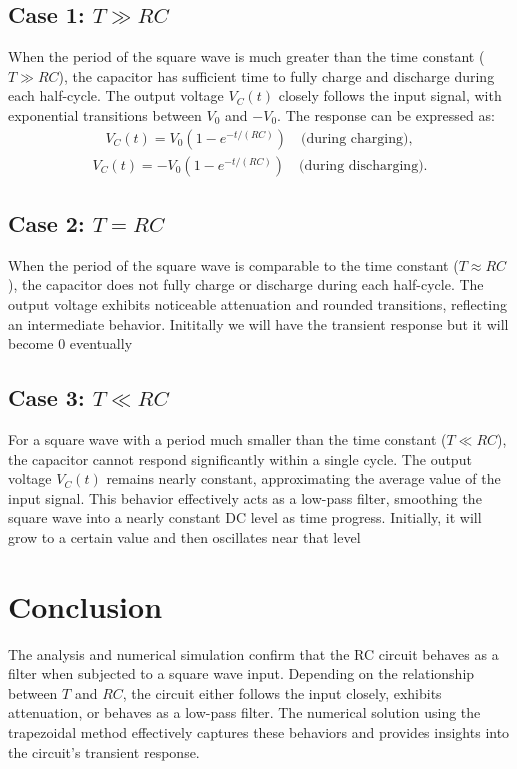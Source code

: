 \documentclass[12pt]{article}
\begin{document}
\subsection{Case 1: $T \gg RC$}
When the period of the square wave is much greater than the time constant ($T \gg RC$), the capacitor has sufficient time to fully charge and discharge during each half-cycle. The output voltage $V_C(t)$ closely follows the input signal, with exponential transitions between $V_0$ and $-V_0$. The response can be expressed as:
\begin{align}
    V_C(t) = V_0 \left(1 - e^{-t/(RC)}\right) \quad \text{(during charging)},
\end{align}
\begin{align}
    V_C(t) = -V_0 \left(1 - e^{-t/(RC)}\right) \quad \text{(during discharging)}.
\end{align}

\subsection{Case 2: $T = RC$}
When the period of the square wave is comparable to the time constant ($T \approx RC$), the capacitor does not fully charge or discharge during each half-cycle. The output voltage exhibits noticeable attenuation and rounded transitions, reflecting an intermediate behavior. Inititally we will have the transient response but it will become 0 eventually

\subsection{Case 3: $T \ll RC$}
For a square wave with a period much smaller than the time constant ($T \ll RC$), the capacitor cannot respond significantly within a single cycle. The output voltage $V_C(t)$ remains nearly constant, approximating the average value of the input signal. This behavior effectively acts as a low-pass filter, smoothing the square wave into a nearly constant DC level as time progress. Initially, it will grow to a certain value and then oscillates near that level 

\section{Conclusion}
The analysis and numerical simulation confirm that the RC circuit behaves as a filter when subjected to a square wave input. Depending on the relationship between $T$ and $RC$, the circuit either follows the input closely, exhibits attenuation, or behaves as a low-pass filter. The numerical solution using the trapezoidal method effectively captures these behaviors and provides insights into the circuit's transient response.
\end{document}

